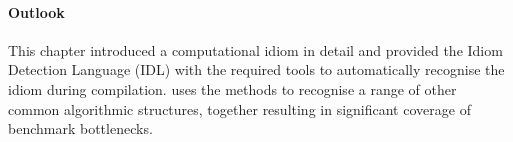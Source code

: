    \paragraph*{Outlook}
    This chapter introduced a computational idiom in detail and provided the
    Idiom Detection Language (IDL) with the required tools to automatically
    recognise the idiom during compilation.
     uses the methods to recognise a range of other common
    algorithmic structures, together resulting in significant coverage of
    benchmark bottlenecks.
